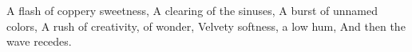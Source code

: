 A flash of coppery sweetness, A clearing of the sinuses, A burst of unnamed colors, A rush of creativity, of wonder, Velvety softness, a low hum, And then the wave recedes.
